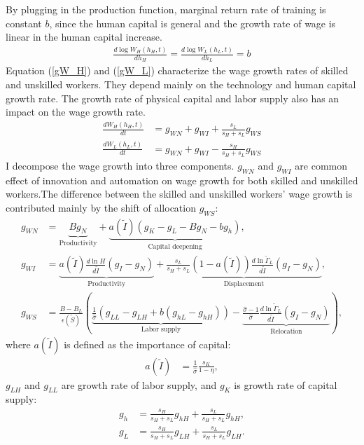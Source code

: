 \documentclass[12pt]{article}
\begin{document}
By plugging in the production function, marginal return rate of training is constant $b$, since the human capital is general and the growth rate of wage is linear in the human capital increase. 
\begin{align*}
\frac{d\log W_H(h_H,t)}{dh_H} = \frac{d\log W_L(h_L,t)}{dh_L} = b
\end{align*}
Equation (\ref{gW_H}) and (\ref{gW_L}) characterize the wage growth rates of skilled and unskilled workers. They depend mainly on the technology and human capital growth rate. The growth rate of physical capital and labor supply also has an impact on the wage growth rate. 
\begin{align}
\label{gW_H}
\frac{dW_H(h_H,t)}{dt} &= g_{WN}+g_{WI}+\frac{s_L}{s_H+s_L}g_{WS}\\
\label{gW_L}
\frac{dW_L(h_L,t)}{dt}  &= g_{WN}+g_{WI}-\frac{s_H}{s_H+s_L}g_{WS}
\end{align}
I decompose the wage growth into three components. $g_{WN}$ and $g_{WI}$ are common effect of innovation and automation on wage growth for both skilled and unskilled workers.The difference between the skilled and unskilled workers' wage growth is contributed mainly by the shift of allocation $g_{WS}$:  
\begin{align}
\label{g_WN}
g_{WN} &= \underbrace{Bg_N}_{\text{Productivity}}+\underbrace{a(\tilde{I})(g_K-g_L-Bg_N-bg_h)}_{\text{Capital deepening}}, \\
\label{g_WI}
g_{WI} &= \underbrace{a(\tilde{I})\frac{d\ln H}{d\tilde{I}}(g_I-g_N)}_{\text{Productivity}}+\underbrace{\frac{s_L}{s_H+s_L}(1-a(\tilde{I}))\frac{d\ln \tilde{\Gamma}_L}{d\tilde{I}}(g_I-g_N)}_{\text{Displacement}}, \\
\label{g_WS}
g_{WS}&= \frac{B-B_L}{\epsilon(\tilde{S})}(\underbrace{\frac{1}{\hat{\sigma}}(g_{LL}-g_{LH}+b(g_{hL}-g_{hH}))}_{\text{Labor supply}}-\underbrace{\frac{\hat{\sigma}-1}{\hat{\sigma}}\frac{d\ln \tilde{\Gamma}_L}{d\tilde{I}}(g_I-g_N)}_{\text{Relocation}}),
\end{align}
where $a(\tilde{I})$ is defined as the importance of capital:
\begin{align*}
a(\tilde{I}) &= \frac{1}{\hat{\sigma}}\frac{s_K}{1-\eta},
\end{align*}
$g_{LH}$ and $g_{LL}$ are growth rate of labor supply, and $g_K$ is growth rate of capital supply:
\begin{align*}
g_h &= \frac{s_H}{s_H+s_L}g_{hH}+\frac{s_L}{s_H+s_L}g_{hH}, \\
g_L &= \frac{s_H}{s_H+s_L}g_{LH}+\frac{s_L}{s_H+s_L}g_{LH}.
\end{align*}
\end{document}
